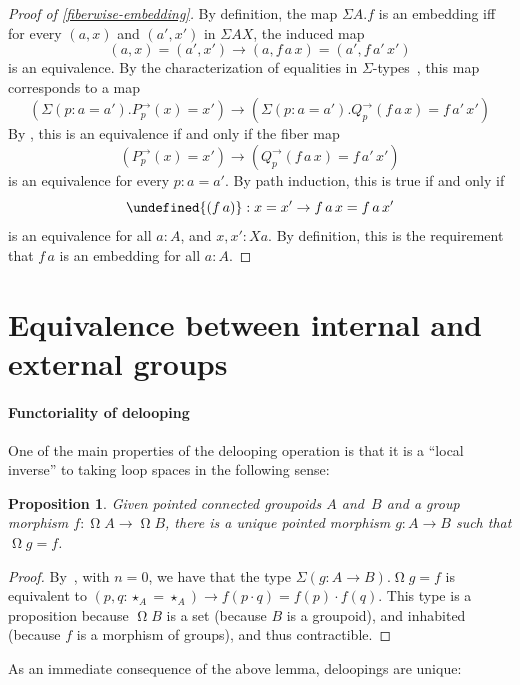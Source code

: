 \documentclass[10pt,a4paper]{amsart}
\newtheorem{proposition}[theorem]{Proposition}
\theoremstyle{definition}
\newcommand{\pt}[1]{\star_{#1}} %
\newcommand{\pcomp}{\cdot} %
\newcommand{\subst}[2]{#1^\to_{#2}} %
\newcommand{\Loop}{\operatorname{\Omega}} %
\let\cong\undefined
\newcommand{\cong}[1]{#1^=} %
\newcommand{\ap}{\cong}
\begin{document}
\begin{proof}[Proof of \cref{fiberwise-embedding}]
  By definition, the map $\Sigma A.f$ is an embedding iff for every $(a,x)$ and
  $(a',x')$ in $\Sigma A X$, the induced map
  \[
    (a, x) = (a', x') \to (a, f\,a\,x) = (a', f\,a'\,x')
  \]
  is an equivalence. By the characterization of equalities in
  $\Sigma$-types~\cite[Theorem~2.7.2]{hottbook}, this map corresponds to a map
  \[
    (\Sigma(p : a = a').\subst Pp(x) = x') \to (\Sigma(p : a = a').\subst Qp(f\,a\,x) = f\,a'\,x')
  \]
  By \cite[Theorem~4.7.7]{hottbook}, this is an equivalence if and only if the
  fiber map
  \[
    (\subst Pp(x) = x') \to (\subst Qp(f\,a\,x) = f\,a'\,x')
  \]
  is an equivalence for every $p : a = a'$. By path induction, this is true if
  and only if
  \[
    \ap{(f\,a)} : x = x' \to f\,a\,x = f\,a\,x'
  \]
  is an equivalence for all $a : A$, and $x,x' : X a$. By definition, this is
  the requirement that $f\,a$ is an embedding for all $a : A$.
\end{proof}

\section{Equivalence between internal and external groups}
\paragraph{Functoriality of delooping}
\label{delooping-functorial}
One of the main properties of the delooping operation is that it is a ``local
inverse'' to taking loop spaces in the following sense:

\begin{proposition}
  \label{delooping-morphisms}
  Given pointed connected groupoids $A$ and~$B$ and a group morphism
  $f:\Loop A\to\Loop B$, there is a unique pointed morphism $g:A\to B$ such
  that $\Loop g=f$.
\end{proposition}
\begin{proof}
  By~\cite[Corollary~12]{warn2023eilenberg}, with $n=0$, we have that the type
  $\Sigma(g:A\to B).\Loop g=f$ is equivalent to
  $(p,q:\pt{A}=\pt{A})\to f(p\pcomp q)=f(p)\pcomp f(q)$. This type is a
  proposition because $\Loop B$ is a set (because $B$ is a groupoid), and
  inhabited (because $f$ is a morphism of groups), and thus contractible.
\end{proof}

\noindent
As an immediate consequence of the above lemma, deloopings are unique:
\end{document}

